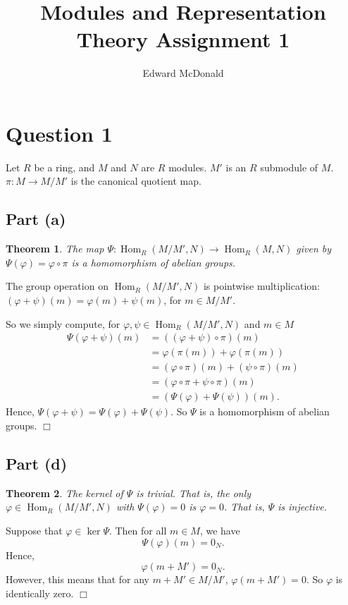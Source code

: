 \documentclass[10pt]{article}
\title{Modules and Representation Theory Assignment 1}
\author{Edward McDonald}
\date{}
\newtheorem{theorem}{Theorem}
\newenvironment{proof}[1][Proof]{\begin{trivlist}
\item[\hskip \labelsep {\bfseries #1}]}{\end{trivlist}}
\newcommand{\Hom}{\operatorname{Hom}}
\begin{document}
\section*{Question 1}
Let $R$ be a ring, and $M$ and $N$ are $R$ modules. $M'$ is an $R$ submodule
of $M$. $\pi:M\rightarrow M/M'$ is the canonical quotient map.
\subsection*{Part (a)}
\begin{theorem}
    The map $\Psi:\Hom_R(M/M',N)\rightarrow \Hom_R(M,N)$ given by
    $\Psi(\varphi) = \varphi\circ\pi$ is a homomorphism of abelian groups.
\end{theorem}
\begin{proof}
    The group operation on $\Hom_R(M/M',N)$ is pointwise multiplication: $(\varphi+\psi)(m) = \varphi(m)+\psi(m)$,
    for $m \in M/M'$.
    
    So we simply compute, for $\varphi,\psi \in\Hom_R(M/M',N)$ and $m \in M$
    \begin{align*}
        \Psi(\varphi+\psi)(m) &= ((\varphi+\psi)\circ\pi)(m)\\
        &= \varphi(\pi(m))+\varphi(\pi(m)) \\
        &= (\varphi\circ\pi)(m)+(\psi\circ\pi)(m)\\
        &= (\varphi\circ\pi+\psi\circ\pi)(m)\\
        &= (\Psi(\varphi)+\Psi(\psi))(m).
    \end{align*}
    Hence, $\Psi(\varphi+\psi) = \Psi(\varphi)+\Psi(\psi)$. So $\Psi$
    is a homomorphism of abelian groups. $\Box$
\end{proof}
\subsection*{Part (d)}
\begin{theorem}
    The kernel of $\Psi$ is trivial. That is, the only
    $\varphi \in \Hom_R(M/M',N)$ with $\Psi(\varphi) = 0$
    is $\varphi = 0$. That is, $\Psi$ is injective.
\end{theorem}
\begin{proof}
    Suppose that $\varphi \in \ker\Psi$. Then for all
    $m \in M$, we have
    \begin{equation*}
        \Psi(\varphi)(m) = 0_N.
    \end{equation*} 
    Hence,
    \begin{equation*}
        \varphi(m+M') = 0_N.
    \end{equation*}
    However, this means that for any $m+M' \in M/M'$, $\varphi(m+M') = 0$.
    So $\varphi$ is identically zero. $\Box$
\end{proof}
\end{document}
